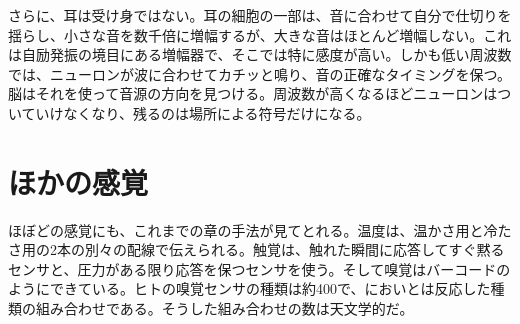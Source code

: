 
さらに、耳は受け身ではない。耳の細胞の一部は、音に合わせて自分で仕切りを揺らし、小さな音を数千倍に増幅するが、大きな音はほとんど増幅しない。これは自励発振の境目にある増幅器で、そこでは特に感度が高い。しかも低い周波数では、ニューロンが波に合わせてカチッと鳴り、音の正確なタイミングを保つ。脳はそれを使って音源の方向を見つける。周波数が高くなるほどニューロンはついていけなくなり、残るのは場所による符号だけになる。

\section*{ほかの感覚}

ほぼどの感覚にも、これまでの章の手法が見てとれる。温度は、温かさ用と冷たさ用の2本の別々の配線で伝えられる。触覚は、触れた瞬間に応答してすぐ黙るセンサと、圧力がある限り応答を保つセンサを使う。そして嗅覚はバーコードのようにできている。ヒトの嗅覚センサの種類は約400で、においとは反応した種類の組み合わせである。そうした組み合わせの数は天文学的だ。

